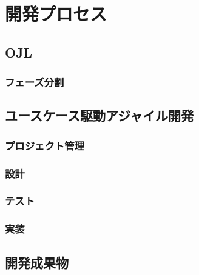 \chapter{開発プロセス}

\section{OJL}

\subsection{フェーズ分割}

\section{ユースケース駆動アジャイル開発}

\subsection{プロジェクト管理}

\subsection{設計}

\subsection{テスト}

\subsection{実装}

\section{開発成果物}
